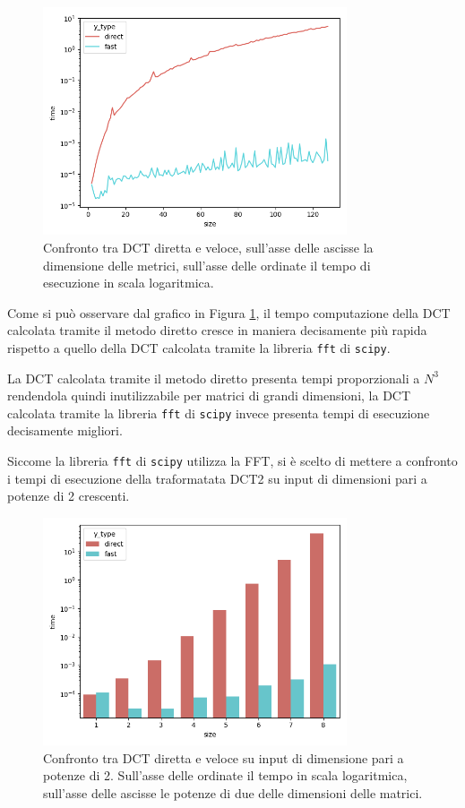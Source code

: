 \documentclass[a4paper, 12pt]{article}
\begin{document}
\begin{figure}[H]
  \centering
  \includegraphics[width=0.8\textwidth]{../test/benchmark-results/bench-incremental-0.png}
  \caption{Confronto tra DCT diretta e veloce, sull'asse delle ascisse la
    dimensione delle metrici, sull'asse delle ordinate il tempo di esecuzione in
    scala logaritmica.}
  \label{fig:incremental-benchmark}
\end{figure}

Come si può osservare dal grafico in Figura
\ref{fig:incremental-benchmark}, il tempo computazione della DCT calcolata
tramite il metodo diretto cresce in maniera decisamente più rapida rispetto a
quello della DCT calcolata tramite la libreria \texttt{fft} di \texttt{scipy}.

La DCT calcolata tramite il metodo diretto presenta tempi proporzionali a $N^3$
rendendola quindi inutilizzabile per matrici di grandi dimensioni, la DCT calcolata
tramite la libreria \texttt{fft} di \texttt{scipy} invece presenta tempi di esecuzione 
decisamente migliori.

Siccome la libreria \texttt{fft} di \texttt{scipy} utilizza la FFT, si è scelto
di mettere a confronto i tempi di esecuzione della traformatata DCT2 su input di
dimensioni pari a potenze di 2 crescenti.

\begin{figure}[H]
  \centering
  \includegraphics[width=0.8\textwidth]{../test/benchmark-results/bench-order-0.png}
  \caption{Confronto tra DCT diretta e veloce su input di dimensione pari a
    potenze di 2. Sull'asse delle ordinate il tempo in scala logaritmica,
    sull'asse delle ascisse le potenze di due delle dimensioni delle matrici.}
  \label{fig:order-benchmark}
\end{figure}
\end{document}
